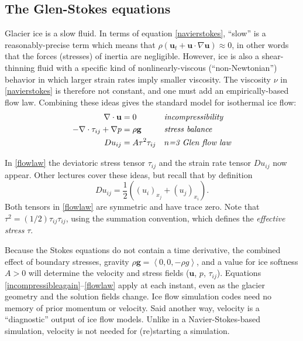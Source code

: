 \documentclass[letterpaper,final,12pt,reqno]{amsart}
\newcommand{\bu}{\mathbf{u}}
\begin{document}
\subsection*{The Glen-Stokes equations}  Glacier ice is a slow fluid.  In terms of equation \eqref{navierstokes}, ``slow'' is a reasonably-precise term which means that $\rho \left(\mathbf{u}_t + \mathbf{u}\cdot\nabla \mathbf{u}\right) \approx 0$, in other words that the forces (stresses) of inertia are negligible.  However, ice is also a shear-thinning fluid with a specific kind of nonlinearly-viscous (``non-Newtonian'') behavior in which larger strain rates imply smaller viscosity.  The viscosity $\nu$ in \eqref{navierstokes} is therefore not constant, and one must add an empirically-based flow law.  Combining these ideas gives the standard model for isothermal ice flow:
\begin{align}
\nabla \cdot \mathbf{u} &= 0 &&\text{\emph{incompressibility}} \label{incompressibleagain} \\
- \nabla \cdot \tau_{ij} + \nabla p &= \rho \mathbf{g} &&\text{\emph{stress balance}} \label{forcebalance} \\
Du_{ij} &= A \tau^2 \tau_{ij} &&\text{\emph{$n$=3 Glen flow law}} \label{flowlaw}
\end{align}

In \eqref{flowlaw} the deviatoric stress tensor $\tau_{ij}$ and the strain rate tensor $Du_{ij}$ now appear.  Other lectures cover these ideas, but recall that by definition
    $$Du_{ij} = \frac{1}{2} \left((u_i)_{x_j}+(u_j)_{x_i}\right).$$
Both tensors in \eqref{flowlaw} are symmetric and have trace zero.  Note that $\tau^2 = (1/2) \tau_{ij} \tau_{ij}$, using the summation convention, which defines the \emph{effective stress} $\tau$.

Because the Stokes equations do not contain a time derivative, the combined effect of boundary stresses, gravity $\rho \mathbf{g} = \left<0,0,-\rho g\right>$, and a value for ice softness $A>0$ will determine the velocity and stress fields ($\bu$, $p$, $\tau_{ij}$).  Equations \eqref{incompressibleagain}--\eqref{flowlaw} apply at each instant, even as the glacier geometry and the solution fields change.  Ice flow simulation codes need no memory of prior momentum or velocity.  Said another way, velocity is a ``diagnostic'' output of ice flow models.  Unlike in a Navier-Stokes-based simulation, velocity is not needed for (re)starting a simulation.
\end{document}
